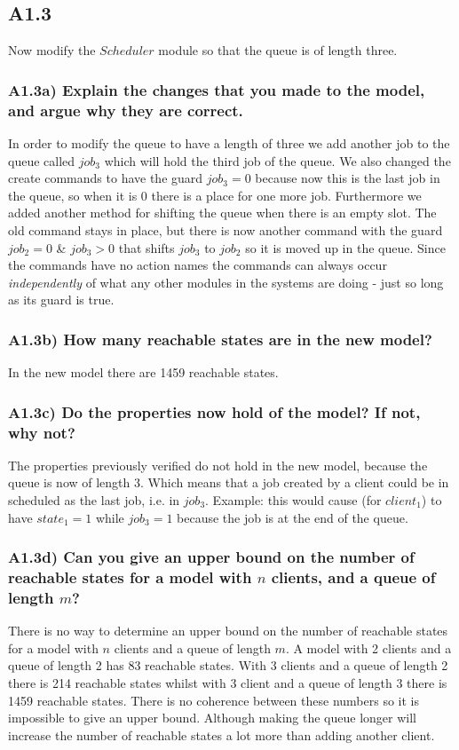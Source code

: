 \documentclass[12pt]{report}
\begin{document}
\subsection*{A1.3}
Now modify the $Scheduler$ module so that the queue is of length three.

\subsubsection*{A1.3a) Explain the changes that you made to the model, and argue why they are correct.}
In order to modify the queue to have a length of three we add another job to the queue called $job_3$ which will hold the third job of the queue. We also changed the create commands to have the guard $job_3 = 0$ because now this is the last job in the queue, so when it is 0 there is a place for one more job. Furthermore we added another method for shifting the queue when there is an empty slot. The old command stays in place, but there is now another command with the guard $job_2=0$ \& $job_3>0$ that shifts $job_3$ to $job_2$ so it is moved up in the queue. Since the commands have no action names the commands can always occur \emph{independently} of what any other modules in the systems are doing - just so long as its guard is true.

\subsubsection*{A1.3b) How many reachable states are in the new model?}
In the new model there are 1459 reachable states.

\subsubsection*{A1.3c) Do the properties now hold of the model? If not, why not?}
The properties previously verified do not hold in the new model, because the queue is now of length 3. Which means that a job created by a client could be in scheduled as the last job, i.e. in $job_3$. Example: this would cause (for $client_1$) to have $state_1 = 1$ while $job_3=1$ because the job is at the end of the queue.

\subsubsection*{A1.3d) Can you give an upper bound on the number of reachable states for a model with $n$ clients, and a queue of length $m$?}
There is no way to determine an upper bound on the number of reachable states for a model with $n$ clients and a queue of length $m$. A model with 2 clients and a queue of length 2 has 83 reachable states. With 3 clients and a queue of length 2 there is 214 reachable states whilst with 3 client and a queue of length 3 there is 1459 reachable states. There is no coherence between these numbers so it is impossible to give an upper bound. Although making the queue longer will increase the number of reachable states a lot more than adding another client.
\end{document}
